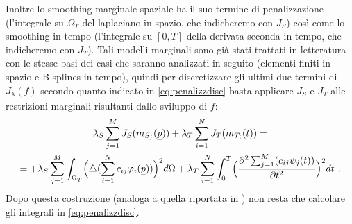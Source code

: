 \documentclass[a4paper,11pt,twoside,openright]{book}							%
\begin{document}
Inoltre lo smoothing marginale spaziale ha il suo termine di penalizzazione (l'integrale su $\Omega_T$ del laplaciano in spazio, che indicheremo con $J_S$) così come lo smoothing in tempo (l'integrale su $[0,T]$ della derivata seconda in tempo, che indicheremo con $J_T$). Tali modelli marginali sono già stati trattati in letteratura con le stesse basi dei casi che saranno analizzati in seguito (elementi finiti in spazio e B-splines in tempo), quindi per discretizzare gli ultimi due termini di $J_{\underline \lambda }(f)$ secondo quanto indicato in \ref{eq:penalizzdisc} basta applicare $J_S$ e $J_T$ alle restrizioni marginali risultanti dallo sviluppo di $f$:
\begin{multline*}
\lambda_S  \sum_{j=1}^M J_S(m_{S_j}(\underline p)) +
\lambda_T \sum_{i=1}^N J_T(m_{T_i}(t)) =\\
=+\lambda_S  \sum_{j=1}^M \int_{\Omega_T} \Bigl( \triangle(\sum_{i=1}^N  c_{ij}\varphi_i (\underline p)) \Bigr)^2 d \Omega + \lambda_T \sum_{i=1}^N\int_0^T \Bigl( \frac{\partial^2 \sum_{j=1}^M(c_{ij}\psi_j(t)) }{\partial t ^2} \Bigr)^2 dt \ .
\end{multline*}
Dopo questa costruzione (analoga a quella riportata in \cite{art:marra}) non resta che calcolare gli integrali in \ref{eq:penalizzdisc}.
\end{document}
